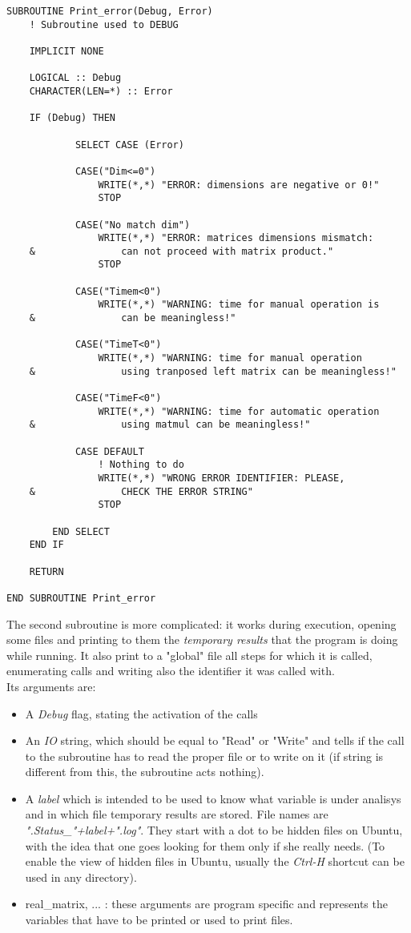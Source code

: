 \documentclass[12pt, a4paper, notitlepage]{report}
\begin{document}
\begin{lstlisting}
SUBROUTINE Print_error(Debug, Error)
	! Subroutine used to DEBUG
	
	IMPLICIT NONE
	
	LOGICAL :: Debug
	CHARACTER(LEN=*) :: Error
	
	IF (Debug) THEN
			
			SELECT CASE (Error)
		
			CASE("Dim<=0")
				WRITE(*,*) "ERROR: dimensions are negative or 0!"
				STOP
			
			CASE("No match dim")
				WRITE(*,*) "ERROR: matrices dimensions mismatch:
	&				can not proceed with matrix product."
				STOP
			
			CASE("Timem<0")
				WRITE(*,*) "WARNING: time for manual operation is
	&				can be meaningless!"
			
			CASE("TimeT<0")
				WRITE(*,*) "WARNING: time for manual operation
	&				using tranposed left matrix can be meaningless!"
			
			CASE("TimeF<0")
				WRITE(*,*) "WARNING: time for automatic operation
	&				using matmul can be meaningless!"
			
			CASE DEFAULT
				! Nothing to do
				WRITE(*,*) "WRONG ERROR IDENTIFIER: PLEASE,
    &				CHECK THE ERROR STRING"
				STOP
		
		END SELECT
	END IF

	RETURN

END SUBROUTINE Print_error
\end{lstlisting}

The second subroutine is more complicated: it works during execution, opening some files and printing to them the \textit{temporary results} that the program is doing while running. It also print to a "global" file all steps for which it is called, enumerating calls and writing also the identifier it was called with.\\
Its arguments are:
\begin{itemize}
	\item A \textit{Debug} flag, stating the activation of the calls
	\item An \textit{IO} string, which should be equal to "Read" or "Write" and tells if the call to the subroutine has to read the proper file or to write on it (if string is different from this, the subroutine acts nothing).
	\item A \textit{label} which is intended to be used to know what variable is under analisys and in which file temporary results are stored. File names are \textit{".Status\_"+label+".log"}. They start with a dot to be hidden files on Ubuntu, with the idea that one goes looking for them only if she really needs. (To enable the view of hidden files in Ubuntu, usually the \textit{Ctrl-H} shortcut can be used in any directory).
	\item real\_matrix, ... : these arguments are program specific and represents the variables that have to be printed or used to print files.
\end{itemize}
\end{document}
